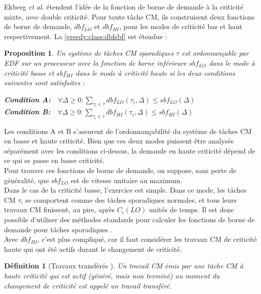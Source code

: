 \documentclass[12pt,a4paper,oneside]{book}
\theoremstyle{break}
\newtheorem{defin}{Définition}[chapter]
\theoremstyle{breakplain}
\newtheorem{prop}{Proposition}[chapter]
\begin{document}
Ekberg \textit{et al.} étendent l'idée de la fonction de borne de demande à la criticité mixte, avec double criticité. Pour toute tâche CM, ils construisent deux fonctions de borne de demande, $dbf_{LO}$ et $dbf_{HI}$, pour les modes de criticité bas et haut respectivement. La \autoref{greedy:class:dbfsbf} est étendue :

\begin{prop}
\label{greedy:mc:dbfsbf}
Un système de tâches CM sporadiques $\tau$ est ordonnançable par \textit{EDF} sur un processeur avec la fonction de borne inférieure $sbf_{LO}$ dans le mode à criticité basse et $sbf_{HI}$ dans le mode à criticité haute si les deux conditions suivantes sont satisfaites :
\begin{center}
\textbf{\textit{Condition A:}}$\quad \forall \Delta \ge 0 : \underset{\tau_i \in \tau}{\sum}dbf_{LO}(\tau_i, \Delta) \le sbf_{LO}(\Delta)$\\
\textbf{\textit{Condition B:}}$\quad \forall \Delta \ge 0 : \underset{\tau_i \in \tau}{\sum}dbf_{HI}(\tau_i, \Delta) \le sbf_{HI}(\Delta)$
\end{center}
\end{prop}

Les conditions A et B s'assurent de l'ordonnançabilité du système de tâches CM en basse et haute criticité. Bien que ces deux modes puissent être analysés séparément avec les conditions ci-dessus, la demande en haute criticité dépend de ce qui se passe en basse criticité.\\

Pour trouver ces fonctions de borne de demande, on suppose, sans perte de généralité, que $sbf_{LO}$ est de vitesse unitaire au maximum.\\

Dans le cas de la criticité basse, l'exercice est simple. Dans ce mode, les tâches CM $\tau_i$ se comportent comme des tâches sporadiques normales, et tous leurs travaux CM finissent, au pire, après $C_i(LO)$ unités de temps. Il est donc possible d'utiliser des méthodes standards pour calculer les fonctions de borne de demande pour tâches sporadiques \cite{baruah1990preemptively}.\\

Avec $dbf_{HI}$, c'est plus compliqué, car il faut considérer les travaux CM de criticité haute qui ont été actifs durant le changement de criticité.\\

\begin{defin}[Travaux transférés \cite{ekberg2012outstanding}]
Un travail CM émis par une tâche CM à haute criticité  qui est actif (généré, mais non terminé) au moment du changement de criticité est appelé un travail transféré.
\end{defin}
\end{document}
